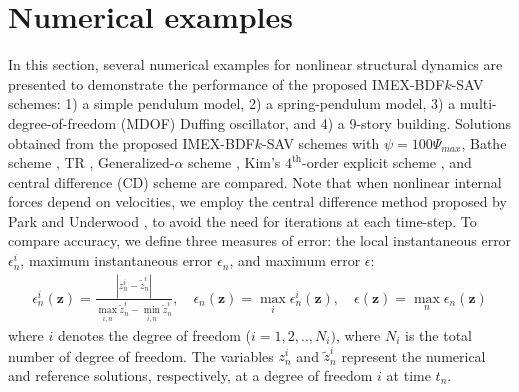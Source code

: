 \documentclass[review]{elsarticle}
\begin{document}
\newpage
\section{Numerical examples}
\label{sec:4th3}
In this section, several numerical examples for nonlinear structural dynamics are presented to demonstrate the performance of the proposed IMEX-BDF$k$-SAV schemes: 1) a simple pendulum model, 2) a spring-pendulum model, 3) a multi-degree-of-freedom (MDOF) Duffing oscillator, and 4) a 9-story building.
Solutions obtained from the proposed IMEX-BDF$k$-SAV schemes with $\psi = 100\Psi_{max}$, Bathe scheme \cite{bathe2005composite,bathe2007conserving}, TR \cite{newmark1959method}, Generalized-$\alpha$ scheme \cite{chung1993time}, Kim's $4^{\textrm{th}}$-order explicit scheme \cite{kim2019higher}, and central difference (CD) scheme are compared. 
Note that when nonlinear internal forces depend on velocities, we employ the central difference method proposed by Park and Underwood \cite{park1980variable}, to avoid the need for iterations at each time-step.
To compare accuracy, we define three measures of error: the local instantaneous error $\epsilon^i_n$, maximum instantaneous error $\epsilon_n$, and maximum error $\epsilon$:
\begin{align}
    \epsilon^i_n(\boldsymbol{z}) = \frac{|z^i_n - \tilde{z}^i_n|}{\displaystyle\max_{i,n}\tilde{z}^i_n - \displaystyle\min_{i,n}\tilde{z}^i_n}, \quad
    \epsilon_n(\boldsymbol{z}) = \displaystyle\max_{i}\epsilon^i_n(\boldsymbol{z}), \quad
    \epsilon(\boldsymbol{z}) = \displaystyle\max_{n}\epsilon_n(\boldsymbol{z})
    \label{eqn:4thErr_definition}
\end{align}
where $i$ denotes the degree of freedom ($i=1,2,..,N_i)$, where $N_i$ is the total number of degree of freedom.
The variables $z^i_n$ and $\tilde{z}^i_n$ represent the numerical and reference solutions, respectively, at a degree of freedom $i$ at time $t_n$.
\end{document}
